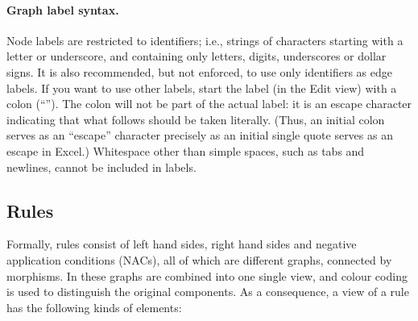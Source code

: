 \paragraph{Graph label syntax.}

Node labels are restricted to identifiers; i.e., strings of characters starting
with a letter or underscore, and containing only letters, digits, underscores
or dollar signs. It is also recommended, but not enforced, to use only
identifiers as edge labels. If you want to use other labels, start the label
(in the Edit view) with a colon (``\lab{:}''). The colon will not be part of
the actual label: it is an escape character indicating that what follows should
be taken literally. (Thus, an initial colon serves as an ``escape'' character
precisely as an initial single quote serves as an escape in Excel.) Whitespace
other than simple spaces, such as tabs and newlines, cannot be included in
labels.

\subsection{Rules}

Formally, rules consist of left hand sides, right hand sides and negative
application conditions (NACs), all of which are different graphs, connected by
morphisms. In \Groove{} these graphs are combined into one single view, and
colour coding is used to distinguish the original components. As a consequence,
a \Groove{} view of a rule has the following kinds of elements:

